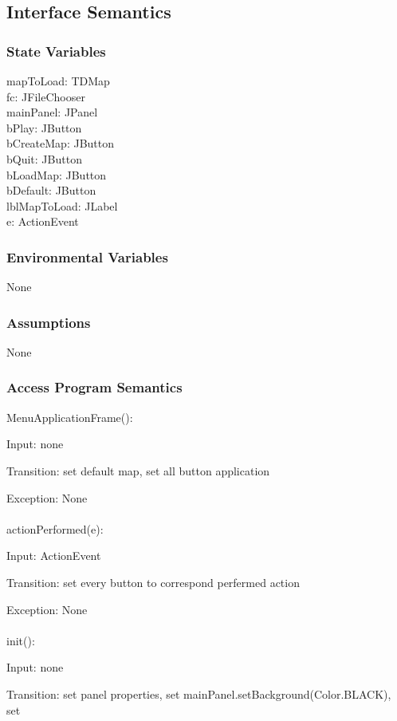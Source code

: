 \documentclass[12,english]{article}
\begin{document}
	\subsection{Interface Semantics}
		\subsubsection{State Variables}
		mapToLoad: TDMap\\
	    fc: JFileChooser\\
	    mainPanel: JPanel\\
	    bPlay: JButton\\
	    bCreateMap: JButton\\
	    bQuit: JButton\\
	    bLoadMap: JButton\\
	    bDefault: JButton\\
	    lblMapToLoad: JLabel\\
	    e: ActionEvent\\
	    
		\subsubsection{Environmental Variables}
		None
		\subsubsection{Assumptions}
        None

		\subsubsection{Access Program Semantics}
		MenuApplicationFrame():
		
		Input: none
		
		Transition: set default map, set all button application
		
		Exception: None\\
		\\
		actionPerformed(e):
		
		Input: ActionEvent
		
		Transition: set every button to correspond perfermed action
		
		Exception: None\\
		\\	
		init():
		
		Input: none
		
		Transition: set panel properties, set mainPanel.setBackground(Color.BLACK), set 
		
\end{document}

